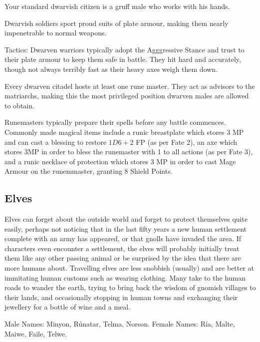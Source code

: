 \label{dwarven_trader}
\dwarventrader

Your standard dwarvish citizen is a gruff male who works with his hands.

\label{dwarven_soldier}
\dwarvensoldier

Dwarvish soldiers sport proud suits of plate armour, making them nearly impenetrable to normal weapons.

	Tactics: Dwarven  warriors typically adopt the Agggressive Stance and trust to their plate armour to keep them safe in battle.  They hit hard and accurately, though not always terribly fast as their heavy axes weigh them down.

\label{dwarven_runemaster}
\dwarvenrunemaster

Every dwarven citadel hosts at least one rune master.  They act as advisors to the matriarchs, making this the most privileged position dwarven males are allowed to obtain.

	Runemasters typically prepare their spells before any battle commences. Commonly made magical items include a runic breastplate which stores 3 MP and can cast  a blessing to restore $1D6+2$ FP (as per Fate 2), an axe which stores 3MP in order to bless the runemaster with 1 to all actions (as per Fate 3), and a runic necklace of protection which stores 3 MP in order to cast Mage Armour on the runemmaster, granting 8 Shield Points.

\subsection{Elves}

Elves can forget about the outside world and forget to protect themselves quite easily, perhaps not noticing that in the last fifty years a new human settlement complete with an army has appeared, or that gnolls have invaded the area.  If characters even encounter a settlement, the elves will probably initially treat them like any other passing animal or be surprised by the idea that there are more humans about.  Travelling elves are less snobbish (usually) and are better at immitating human customs such as wearing clothing.  Many take to the human roads to wander the earth, trying to bring back the wisdom of gnomish villages to their lands, and occasionally stopping in human towns and exchanging their jewellery for a bottle of wine and a meal.

	Male Names: Minyon, R\'{u}natar, Telma, Norson.  Female Names: R\'{i}a, Malte, Maiwe, Faile, Telwe.

